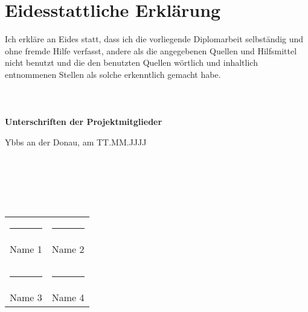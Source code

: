 \chapter*{Eidesstattliche Erklärung} 

Ich erkläre an Eides statt, dass ich die vorliegende Diplomarbeit selbständig und ohne fremde Hilfe verfasst, 
andere als die angegebenen Quellen und Hilfsmittel nicht benutzt und die den benutzten Quellen wörtlich und inhaltlich entnommenen Stellen 
als solche erkenntlich gemacht habe.
\\\\\\\\

\textbf{Unterschriften der Projektmitglieder}

Ybbs an der Donau, am TT.MM.JJJJ
\\\\\\\\\\\\

\begin{table}[ht]
  \begin{tabular}{p{8cm} p{8cm}}
    \rule{6cm}{0.01cm} & \rule{6cm}{0.01cm}\\
    Name 1 & Name 2\\
    \\
    \\
    \rule{6cm}{0.01cm} & \rule{6cm}{0.01cm}\\
    Name 3 & Name 4
  \end{tabular}
\end{table}